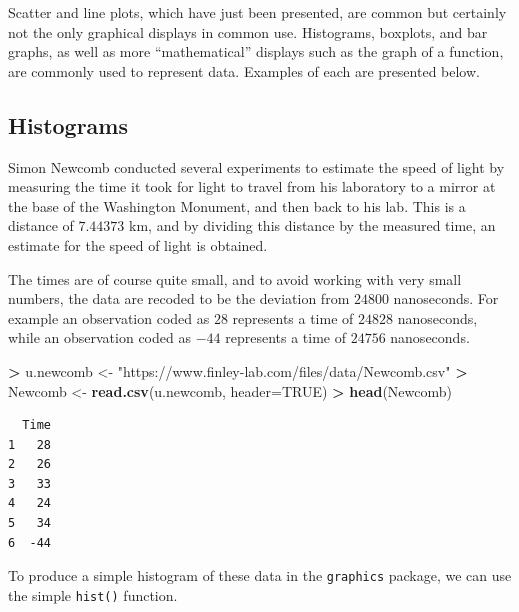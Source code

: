 \documentclass[
]{krantz}
\makeatletter
\newenvironment{Shaded}{\begin{snugshade}}{\end{snugshade}}
\newcommand{\DataTypeTok}[1]{\textcolor[rgb]{0.27,0.27,0.27}{#1}}
\newcommand{\KeywordTok}[1]{\textcolor[rgb]{0.27,0.27,0.27}{\textbf{#1}}}
\newcommand{\NormalTok}[1]{#1}
\newcommand{\OperatorTok}[1]{\textcolor[rgb]{0.43,0.43,0.43}{\textbf{#1}}}
\newcommand{\OtherTok}[1]{\textcolor[rgb]{0.37,0.37,0.37}{#1}}
\newcommand{\StringTok}[1]{\textcolor[rgb]{0.5,0.5,0.5}{#1}}
\newenvironment{kframe}{%
\medskip{}
\setlength{\fboxsep}{.8em}
 \def\at@end@of@kframe{}%
 \ifinner\ifhmode%
  \def\at@end@of@kframe{\end{minipage}}%
  \begin{minipage}{\columnwidth}%
 \fi\fi%
 \def\FrameCommand##1{\hskip\@totalleftmargin \hskip-\fboxsep
 \colorbox{shadecolor}{##1}\hskip-\fboxsep
     \hskip-\linewidth \hskip-\@totalleftmargin \hskip\columnwidth}%
 \MakeFramed {\advance\hsize-\width
   \@totalleftmargin\z@ \linewidth\hsize
   \@setminipage}}%
 {\par\unskip\endMakeFramed%
 \at@end@of@kframe}
\renewenvironment{Shaded}{\begin{kframe}}{\end{kframe}}
\makeatother
\begin{document}
Scatter and line plots, which have just been presented, are common but certainly not the only graphical displays in common use. Histograms, boxplots, and bar graphs, as well as more ``mathematical'' displays such as the graph of a function, are commonly used to represent data. Examples of each are presented below.

\hypertarget{histograms-1}{%
\subsection{Histograms}\label{histograms-1}}

Simon Newcomb conducted several experiments to estimate the speed of light by measuring the time it took for light to travel from his laboratory to a mirror at the base of the Washington Monument, and then back to his lab. This is a distance of \(7.44373\) km, and by dividing this distance by the measured time, an estimate for the speed of light is obtained.

The times are of course quite small, and to avoid working with very small numbers, the data are recoded to be the deviation from \(24800\) nanoseconds. For example an observation coded as \(28\) represents a time of \(24828\) nanoseconds, while an observation coded as \(-44\) represents a time of \(24756\) nanoseconds.

\begin{Shaded}
\begin{Highlighting}[]
\OperatorTok{\textgreater{}}\StringTok{ }\NormalTok{u.newcomb \textless{}{-}}\StringTok{ "https://www.finley{-}lab.com/files/data/Newcomb.csv"}
\OperatorTok{\textgreater{}}\StringTok{ }\NormalTok{Newcomb \textless{}{-}}\StringTok{ }\KeywordTok{read.csv}\NormalTok{(u.newcomb, }\DataTypeTok{header=}\OtherTok{TRUE}\NormalTok{)}
\OperatorTok{\textgreater{}}\StringTok{ }\KeywordTok{head}\NormalTok{(Newcomb)}
\end{Highlighting}
\end{Shaded}

\begin{verbatim}
  Time
1   28
2   26
3   33
4   24
5   34
6  -44
\end{verbatim}

To produce a simple histogram of these data in the \texttt{graphics} package, we can use the simple \texttt{hist()} function.

\begin{Shaded}
\end{Shaded}
\end{document}
